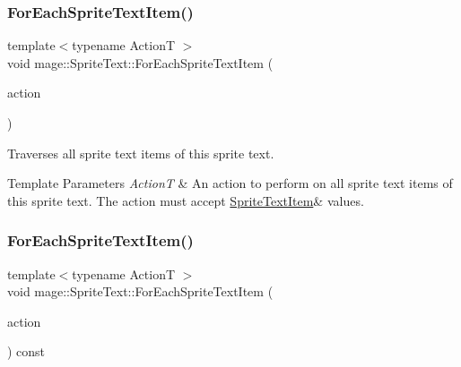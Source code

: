 \hypertarget{classmage_1_1_sprite_text_af1236ba7c80c61be058a21ef1d4c483d}{}\label{classmage_1_1_sprite_text_af1236ba7c80c61be058a21ef1d4c483d} 
\subsubsection{\texorpdfstring{For\+Each\+Sprite\+Text\+Item()}{ForEachSpriteTextItem()}\hspace{0.1cm}{\footnotesize\ttfamily [1/2]}}
{\footnotesize\ttfamily template$<$typename ActionT $>$ \\
void mage\+::\+Sprite\+Text\+::\+For\+Each\+Sprite\+Text\+Item (\begin{DoxyParamCaption}\item[{ActionT}]{action }\end{DoxyParamCaption})\hspace{0.3cm}{\ttfamily [protected]}}

Traverses all sprite text items of this sprite text.


\begin{DoxyTemplParams}{Template Parameters}
{\em ActionT} & An action to perform on all sprite text items of this sprite text. The action must accept {\ttfamily \hyperlink{structmage_1_1_sprite_text_item}{Sprite\+Text\+Item}\&} values. \\
\hline
\end{DoxyTemplParams}
\hypertarget{classmage_1_1_sprite_text_ab8576580e5b3c0bb568c1256a0b989bc}{}\label{classmage_1_1_sprite_text_ab8576580e5b3c0bb568c1256a0b989bc} 
\subsubsection{\texorpdfstring{For\+Each\+Sprite\+Text\+Item()}{ForEachSpriteTextItem()}\hspace{0.1cm}{\footnotesize\ttfamily [2/2]}}
{\footnotesize\ttfamily template$<$typename ActionT $>$ \\
void mage\+::\+Sprite\+Text\+::\+For\+Each\+Sprite\+Text\+Item (\begin{DoxyParamCaption}\item[{ActionT}]{action }\end{DoxyParamCaption}) const\hspace{0.3cm}{\ttfamily [protected]}}

